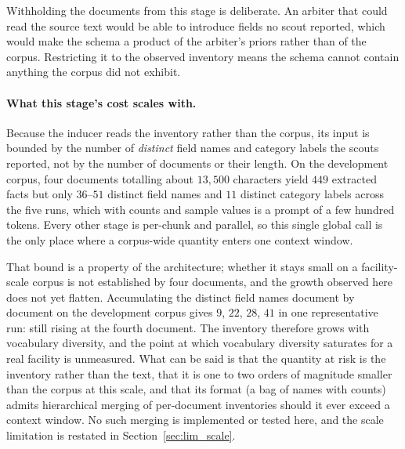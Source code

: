 \documentclass[11pt]{article}
\begin{document}
Withholding the documents from this stage is deliberate. An arbiter that could
read the source text would be able to introduce fields no scout reported, which
would make the schema a product of the arbiter's priors rather than of the
corpus. Restricting it to the observed inventory means the schema cannot contain
anything the corpus did not exhibit.

\paragraph{What this stage's cost scales with.}
Because the inducer reads the inventory rather than the corpus, its input is
bounded by the number of \emph{distinct} field names and category labels the
scouts reported, not by the number of documents or their length. On the
development corpus, four documents totalling about $13{,}500$ characters yield
$449$ extracted facts but only $36$--$51$ distinct field names and $11$ distinct
category labels across the five runs, which with counts and sample values is a
prompt of a few hundred tokens. Every other stage is per-chunk and parallel, so
this single global call is the only place where a corpus-wide quantity enters
one context window.

That bound is a property of the architecture; whether it stays small on a
facility-scale corpus is not established by four documents, and the growth
observed here does not yet flatten. Accumulating the distinct field names
document by document on the development corpus gives $9$, $22$, $28$, $41$ in
one representative run: still rising at the fourth document. The inventory
therefore grows with vocabulary diversity, and the point at which vocabulary
diversity saturates for a real facility is unmeasured. What can be said is that
the quantity at risk is the inventory rather than the text, that it is one to
two orders of magnitude smaller than the corpus at this scale, and that its
format (a bag of names with counts) admits hierarchical merging of per-document
inventories should it ever exceed a context window. No such merging is
implemented or tested here, and the scale limitation is restated in
Section~\ref{sec:lim_scale}.
\end{document}
